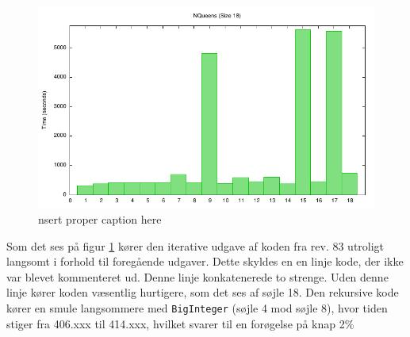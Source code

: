 \begin{figure}[h]
\begin{center}
\includegraphics{../benchmarks/b3.pdf}
\caption{nsert proper caption here } 
\label{plot:b3}
\end{center}
\end{figure}

Som det ses på figur \ref{plot:b3} kører den iterative udgave af koden fra
rev. 83 utroligt langsomt i forhold til foregående udgaver. 
Dette skyldes en en linje kode, der ikke var blevet kommenteret ud. Denne linje
konkatenerede to strenge. Uden denne linje kører koden væsentlig hurtigere, som
det ses af søjle 18. Den rekursive kode kører en smule langsommere med
\texttt{BigInteger} (søjle 4 mod søjle 8), hvor tiden stiger fra 406.xxx til
414.xxx, hvilket svarer til en forøgelse på knap 2\%

